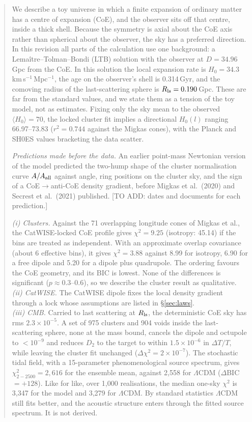\documentclass[11pt]{article}
\newcommand{\todo}[1]{\textsf{[#1]}}
\begin{document}
\begin{abstract}
\noindent We describe a toy universe in which a finite expansion of ordinary matter has a centre of expansion (CoE), and the observer sits off that centre, inside a thick shell. Because the symmetry is axial about the CoE axis rather than spherical about the observer, the sky has a preferred direction. In this revision all parts of the calculation use one background: a Lema\^itre--Tolman--Bondi (LTB) solution with the observer at $D=34.96$\,Gpc from the CoE. In this solution the local expansion rate is $H_0=34.3$\,km\,s$^{-1}$\,Mpc$^{-1}$, the age on the observer's shell is 0.314\,Gyr, and the comoving radius of the last-scattering sphere is $R_{\rm ls}=0.190$\,Gpc. These are far from the standard values, and we state them as a tension of the toy model, not as estimates. Fixing only the sky mean to the observed $\langle H_0\rangle=70$, the locked cluster fit implies a directional $H_0(l)$ ranging 66.97--73.83 ($r^2=0.744$ against the Migkas cones), with the Planck and SH0ES values bracketing the data scatter.

\emph{Predictions made before the data.} An earlier point-mass Newtonian version of the model predicted the two-hump shape of the cluster normalisation curve $A/A_{\rm all}$ against angle, ring positions on the cluster sky, and the sign of a CoE$\to$anti-CoE density gradient, before Migkas et al.\ (2020) and Secrest et al.\ (2021) published. \todo{TO ADD: dates and documents for each prediction.}

\emph{(i) Clusters.} Against the 71 overlapping longitude cones of Migkas et al., the CatWISE-locked CoE profile gives $\chi^2=9.25$ (isotropy: 45.14) if the bins are treated as independent. With an approximate overlap covariance (about 6 effective bins), it gives $\chi^2=3.88$ against 8.99 for isotropy, 6.90 for a free dipole and 5.20 for a dipole plus quadrupole. The ordering favours the CoE geometry, and its BIC is lowest. None of the differences is significant ($p\approx0.3$--0.6), so we describe the cluster result as qualitative. \\
\emph{(ii) CatWISE.} The CatWISE dipole fixes the local density gradient through a lock whose assumptions are listed in \S\ref{sec:laws}. \\
\emph{(iii) CMB.} Carried to last scattering at $R_{\rm ls}$, the deterministic CoE sky has rms $2.3\times10^{-5}$. A set of 975 clusters and 904 voids inside the last-scattering sphere, none at the mass bound, cancels the dipole and octupole to $<10^{-9}$ and reduces $D_2$ to the target to within $1.5\times10^{-6}$ in $\Delta T/T$, while leaving the cluster fit unchanged ($\Delta\chi^2=2\times10^{-7}$). The stochastic tidal field, with a 15-parameter phenomenological source spectrum, gives $\chi^2_{2-2500}=2{,}616$ for the ensemble mean, against 2,558 for $\Lambda$CDM ($\Delta$BIC $=+128$). Like for like, over 1,000 realisations, the median one-sky $\chi^2$ is 3,347 for the model and 3,279 for $\Lambda$CDM. By standard statistics $\Lambda$CDM still fits better, and the acoustic structure enters through the fitted source spectrum. It is not derived.
\end{abstract}
\end{document}
